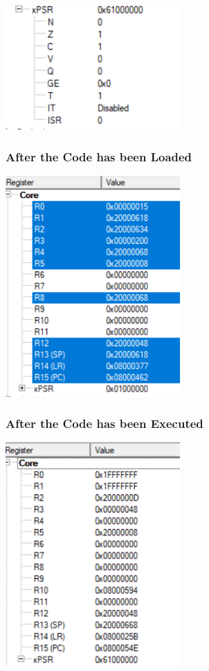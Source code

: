 \documentclass{article}
\begin{document}
\begin{center}
    \includegraphics[width=0.5\textwidth]{task_iv_B_PSR.png}
\end{center}

\subsubsection{After the Code has been Loaded}

\begin{center}
    \includegraphics[width=0.5\textwidth]{task_iv_B_before.png}
\end{center}

\subsubsection{After the Code has been Executed}

\begin{center}
    \includegraphics[width=0.5\textwidth]{task_iv_B_after.png}
\end{center}
\end{document}
